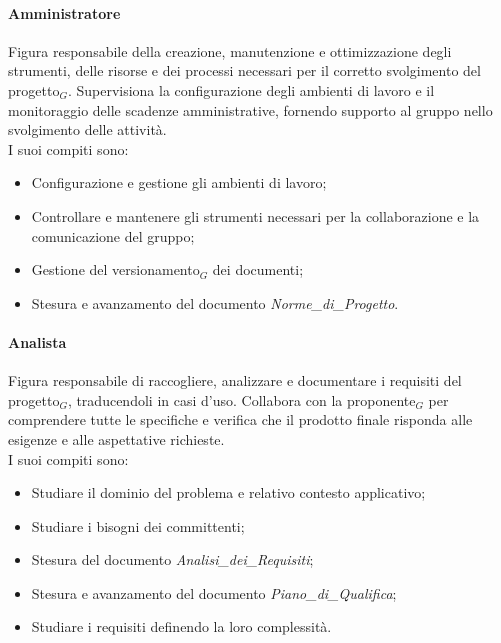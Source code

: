 \documentclass[10pt]{article}
\begin{document}
\begin{justify}
        \paragraph{Amministratore}
        Figura responsabile della creazione, manutenzione e ottimizzazione degli strumenti, delle risorse e dei processi necessari per il corretto svolgimento del progetto$_G$. Supervisiona la configurazione degli ambienti di lavoro e il monitoraggio delle scadenze amministrative, fornendo supporto al gruppo nello svolgimento delle attività.\\
        I suoi compiti sono:
        \begin{itemize}
            \item Configurazione e gestione gli ambienti di lavoro;
            \item Controllare e mantenere gli strumenti necessari per la collaborazione e la comunicazione del gruppo;
            \item Gestione del versionamento$_G$ dei documenti;
            \item Stesura e avanzamento del documento \textit{Norme\_di\_Progetto}.
        \end{itemize}

        \paragraph{Analista}
        Figura responsabile di raccogliere, analizzare e documentare i requisiti del progetto$_G$, traducendoli in casi d'uso. Collabora con la proponente$_G$ per comprendere tutte le specifiche e verifica che il prodotto finale risponda alle esigenze e alle aspettative richieste.\\
        I suoi compiti sono:
        \begin{itemize}
            \item Studiare il dominio del problema e relativo contesto applicativo;
            \item Studiare i bisogni dei committenti;
            \item Stesura del documento \textit{Analisi\_dei\_Requisiti};
            \item Stesura e avanzamento del documento \textit{Piano\_di\_Qualifica};
            \item Studiare i requisiti definendo la loro complessità.
        \end{itemize}


\end{justify}
\end{document}
